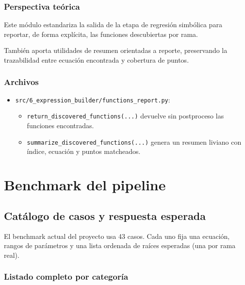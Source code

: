 \documentclass[12pt]{article}
\begin{document}
\subsubsection*{Perspectiva teórica}
Este módulo estandariza la salida de la etapa de regresión simbólica para reportar, de forma explícita, las funciones descubiertas por rama.

También aporta utilidades de resumen orientadas a reporte, preservando la trazabilidad entre ecuación encontrada y cobertura de puntos.

\subsubsection*{Archivos}
\begin{itemize}[leftmargin=1.5em]
    \item \texttt{src/6\_expression\_builder/functions\_report.py}:
    \begin{itemize}[leftmargin=1.5em]
        \item \texttt{return\_discovered\_functions(...)} devuelve sin postproceso las funciones encontradas.
        \item \texttt{summarize\_discovered\_functions(...)} genera un resumen liviano con índice, ecuación y puntos matcheados.
    \end{itemize}
\end{itemize}

\section{Benchmark del pipeline}
\subsection{Catálogo de casos y respuesta esperada}
El benchmark actual del proyecto usa 43 casos. Cada uno fija una ecuación, rangos de parámetros y una lista ordenada de raíces esperadas (una por rama real).

\subsubsection*{Listado completo por categoría}

\newcommand{\casobench}[3]{%
    \item \textbf{\texttt{#1}}\\
    \textbf{Ecuación:}\\
    \begin{minipage}[t]{0.92\linewidth}\ttfamily #2 = 0\end{minipage}\\
    \textbf{Ramas esperadas:}\\
    \begin{minipage}[t]{0.92\linewidth}\ttfamily #3\end{minipage}
    \vspace{0.35em}
}
\end{document}

